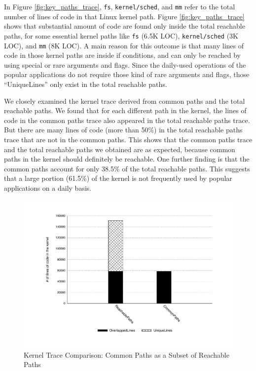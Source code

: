 In Figure \ref{fig:key_paths_trace}, \texttt{fs}, \texttt{kernel/sched}, 
and \texttt{mm} refer to the total number of lines of code in that Linux kernel path. 
Figure \ref{fig:key_paths_trace} shows that 
substantial amount of code are found only inside the total reachable paths, 
for some essential kernel paths like \texttt{fs} (6.5K LOC), 
\texttt{kernel/sched} (3K LOC), 
and \texttt{mm} (8K LOC). 
A main reason for this outcome is that many lines of code in those kernel paths 
are inside if conditions, and can only be reached by using special or 
rare arguments and flags. Since the daily-used operations of 
the popular applications do not require those kind of rare arguments 
and flags, those ``UniqueLines'' only exist in the total reachable paths. 

We closely examined the kernel trace derived from common paths
and the total reachable paths. We found that for each different path
in the kernel, the lines of code 
in the common paths trace also appeared in the total reachable paths trace.
But there are many lines of code (more than 50\%) 
in the total reachable paths trace that are not in the common paths. This
shows that the common paths trace and 
the total reachable paths we obtained are as expected, because common paths in
the kernel should definitely be reachable.  
One further finding is that the common paths account
for only 38.5\% of the total reachable paths. 
This suggests that a large portion (61.5\%) of the kernel is not frequently
used by popular applications on a daily basis.

\begin{figure}
\centering
\includegraphics[width=1.0\columnwidth]{diagram/lind_oakland16_diagram_01.pdf}
\caption{Kernel Trace Comparison: Common Paths as a Subset of Reachable
Paths}
\label{fig:subset}
\end{figure}

